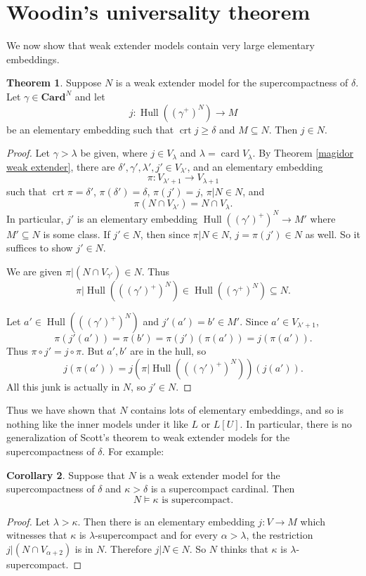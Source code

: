 \documentclass[12pt]{report}
\newcommand{\card}{\operatorname{card}}
\newcommand{\Card}{\mathbf{Card}}
\DeclareMathOperator{\Hull}{Hull}
\DeclareMathOperator{\crt}{crt}
\theoremstyle{definition}
\newtheorem{theorem}{Theorem}[chapter]
\newtheorem{corollary}[theorem]{Corollary}
\begin{document}
\section{Woodin's universality theorem}
We now show that weak extender models contain very large elementary embeddings.
\begin{theorem}
Suppose $N$ is a weak extender model for the supercompactness of $\delta$. Let $\gamma \in \Card^N$ and let
$$j: \Hull((\gamma^+)^N) \to M$$
be an elementary embedding such that $\crt j \geq \delta$ and $M \subseteq N$. Then $j \in N$.
\end{theorem}
\begin{proof}
Let $\gamma > \lambda$ be given, where $j \in V_\lambda$ and $\lambda = \card V_\lambda$.
By Theorem \ref{magidor weak extender}, there are $\delta',\gamma',\lambda',j' \in V_{\lambda'}$, and an elementary embedding
$$\pi: V_{\lambda' + 1} \to V_{\lambda + 1}$$
such that $\crt \pi = \delta'$, $\pi(\delta') = \delta$, $\pi(j') = j$, $\pi|N \in N$, and
$$\pi(N \cap V_{\lambda'}) = N \cap V_\lambda.$$
In particular, $j'$ is an elementary embedding $\Hull((\gamma')^+)^N \to M'$ where $M' \subseteq N$ is some class.
If $j' \in N$, then since $\pi|N \in N$, $j = \pi(j') \in N$ as well.
So it suffices to show $j' \in N$.

We are given $\pi|(N \cap V_{\gamma'}) \in N$.
Thus
$$\pi|\Hull(((\gamma')^+)^N) \in \Hull((\gamma^+)^N) \subseteq N.$$

Let $a' \in \Hull(((\gamma')^+)^N)$ and $j'(a') = b' \in M'$. Since $a' \in V_{\lambda' + 1}$,
$$\pi(j'(a')) = \pi(b') = \pi(j')(\pi(a')) = j(\pi(a')).$$
Thus $\pi \circ j' = j \circ \pi$.
But $a',b'$ are in the hull, so
$$j(\pi(a')) = j(\pi|\Hull(((\gamma')^+)^N))(j(a')).$$
All this junk is actually in $N$, so $j' \in N$.
\end{proof}
Thus we have shown that $N$ contains lots of elementary embeddings, and so is nothing like the inner models under it like $L$ or $L[U]$.
In particular, there is no generalization of Scott's theorem to weak extender models for the supercompactness of $\delta$. For example:
\begin{corollary}
Suppose that $N$ is a weak extender model for the supercompactness of $\delta$ and $\kappa > \delta$ is a supercompact cardinal. Then
$$N \models \text{$\kappa$ is supercompact.}$$
\end{corollary}
\begin{proof}
Let $\lambda > \kappa$. Then there is an elementary embedding $j: V \to M$ which witnesses that $\kappa$ is $\lambda$-supercompact and for every $\alpha > \lambda$, the restriction $j|(N \cap V_{\alpha+2})$ is in $N$. Therefore $j|N \in N$. So $N$ thinks that $\kappa$ is $\lambda$-supercompact.
\end{proof}
\end{document}
